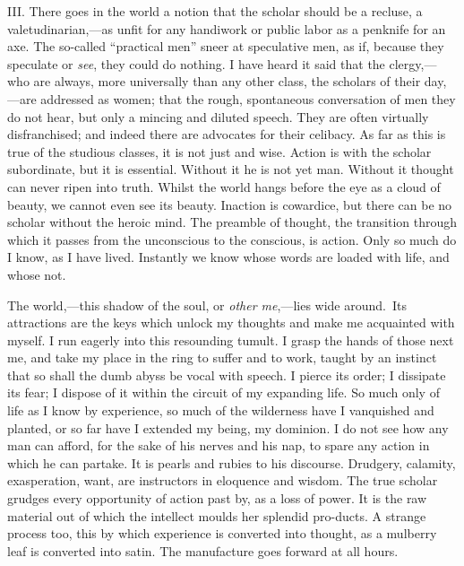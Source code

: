 III. There goes in the world a notion that the scholar should be a
recluse, a val\-e\-tu\-di\-nar\-i\-an,---as unfit for any handiwork or
public labor as a penknife for an axe. The so-called ``practical men''
sneer at speculative men, as if, because they speculate or
\textit{see}, they could do nothing. I have heard it said that the
cler\-gy,---who are always, more universally than any other class, the
scholars of their day,---are addressed as women; that the rough,
spontaneous conversation of men they do not hear, but only a mincing
and diluted speech. They are often virtually disfranchised; and indeed
there are advocates for their celibacy. As far as this is true of the
studious classes, it is not just and wise. Action is with the
scholar subordinate, but it is essential. Without it he is not yet
man. Without it thought can never ripen into truth. Whilst the world
hangs before the eye as a cloud of beauty, we cannot even see its
beauty. Inaction is cowardice, but there can be no scholar without the
heroic mind. The preamble of thought, the transition  through
which it passes from the unconscious to the conscious, is action. Only
so much do I know, as I have lived. Instantly we know whose words
are loaded with life, and whose not.

The world,---this shadow of the soul, or \textit{other me},---lies
wide a\-round. Its attractions are the keys which unlock my thoughts
and make me acquainted with myself. I run eagerly into this resounding
tumult. I grasp the hands of those next me, and take my place in the
ring to suffer and to work, taught by an instinct that so shall the
dumb abyss be vocal with speech. I pierce its order; I dissipate its
fear; I dispose of it within the circuit of my expanding life. So much
only of life as I know by experience, so much of the wilderness have I
vanquished and planted, or so far have I extended my being, my
dominion. I do not see how any man can afford, for the sake of his
nerves and his nap, to spare any action in which he can partake. It is
pearls and rubies to his discourse. Drudgery, calamity, exasperation,
want, are instructors in eloquence and wisdom. The true scholar
grudges every opportunity of action past by, as a loss of power. It is
the raw material out of which the intellect moulds her splendid
pro-ducts. A strange process too, this by which experience is
converted into thought, as a mulberry leaf is converted into satin.
The manufacture goes forward at all hours.

